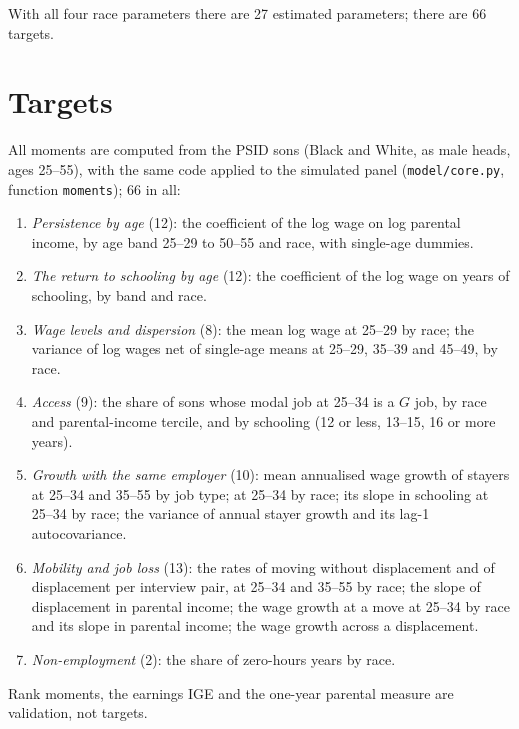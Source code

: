 \documentclass[11pt]{article}
\newcommand{\code}[1]{\texttt{#1}}
\newcommand{\1}{\mathbf{1}}
\begin{document}
With all four race parameters there are 27 estimated parameters; there are 66 targets.

\section{Targets}\label{sec:targets}

All moments are computed from the PSID sons (Black and White, as male heads, ages 25--55), with the same code applied
to the simulated panel (\code{model/core.py}, function \code{moments}); 66 in all:
\begin{enumerate}
  \item \textit{Persistence by age} (12): the coefficient of the log wage on log parental income, by age band 25--29 to
  50--55 and race, with single-age dummies.
  \item \textit{The return to schooling by age} (12): the coefficient of the log wage on years of schooling, by band and
  race.
  \item \textit{Wage levels and dispersion} (8): the mean log wage at 25--29 by race; the variance of log wages net of
  single-age means at 25--29, 35--39 and 45--49, by race.
  \item \textit{Access} (9): the share of sons whose modal job at 25--34 is a $G$ job, by race and parental-income tercile,
  and by schooling (12 or less, 13--15, 16 or more years).
  \item \textit{Growth with the same employer} (10): mean annualised wage growth of stayers at 25--34 and 35--55 by job
  type; at 25--34 by race; its slope in schooling at 25--34 by race; the variance of annual stayer growth and its lag-1
  autocovariance.
  \item \textit{Mobility and job loss} (13): the rates of moving without displacement and of displacement per interview
  pair, at 25--34 and 35--55 by race; the slope of displacement in parental income; the wage growth at a move at 25--34 by
  race and its slope in parental income; the wage growth across a displacement.
  \item \textit{Non-employment} (2): the share of zero-hours years by race.
\end{enumerate}
Rank moments, the earnings IGE and the one-year parental measure are validation, not targets.
\end{document}
